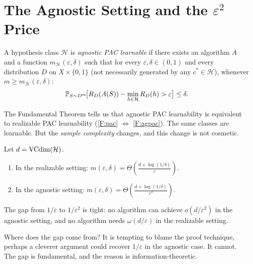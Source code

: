 
\section{The Agnostic Setting and the \texorpdfstring{$\varepsilon^2$}{epsilon-squared} Price}
\label{sec:agnostic}

\begin{defn}
\label{def:agnostic-pac}
A hypothesis class $\mathcal{H}$ is \emph{agnostic PAC learnable} if there
exists an algorithm $A$ and a function $m_\mathcal{H}(\varepsilon, \delta)$
such that for every $\varepsilon, \delta \in (0,1)$ and every distribution $D$
on $X \times \{0,1\}$ (not necessarily generated by any $c^* \in \mathcal{H}$),
whenever $m \geq m_\mathcal{H}(\varepsilon, \delta)$:
\[
  \mathbb{P}_{S \sim D^m}\!\bigl[
    R_D(A(S)) - \min_{h \in \mathcal{H}} R_D(h) > \varepsilon
  \bigr] \leq \delta.
\]
\end{defn}

The Fundamental Theorem tells us that agnostic PAC learnability is
equivalent to realizable PAC learnability (\ref{F:pac} $\Leftrightarrow$
\ref{F:agpac}).  The same classes are learnable.  But the \emph{sample
complexity} changes, and this change is not cosmetic.

\begin{thm}
\label{thm:agnostic-gap}
Let $d = \mathrm{VCdim}(\mathcal{H})$.
\begin{enumerate}[label=(\alph*)]
\item In the realizable setting:
  $m(\varepsilon, \delta) = \Theta\!\left(\frac{d +
  \log(1/\delta)}{\varepsilon}\right)$.
\item In the agnostic setting:
  $m(\varepsilon, \delta) = \Theta\!\left(\frac{d +
  \log(1/\delta)}{\varepsilon^2}\right)$.
\end{enumerate}
The gap from $1/\varepsilon$ to $1/\varepsilon^2$ is tight: no algorithm can
achieve $o(d/\varepsilon^2)$ in the agnostic setting, and no algorithm needs
$\omega(d/\varepsilon)$ in the realizable setting.
\end{thm}

Where does the gap come from?  It is tempting to blame the proof technique, perhaps a
cleverer argument could recover $1/\varepsilon$ in the agnostic case.  It
cannot.  The gap is fundamental, and the reason is information-theoretic.


